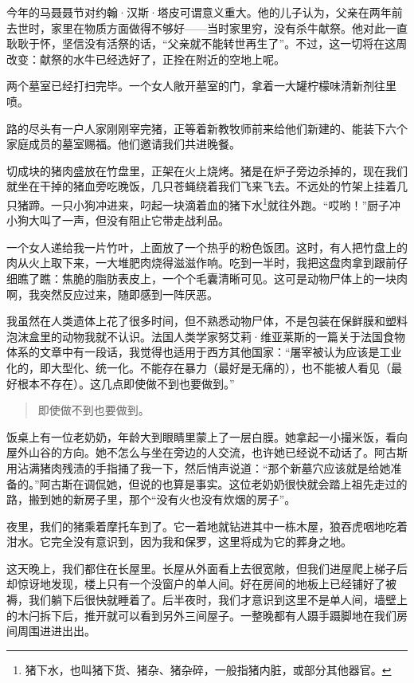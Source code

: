 \documentclass[12pt,oneside]{book}
\begin{document}
\begin{bookref}[frametitle={\cite{好好告别：世界葬礼观察手记}}]
今年的马聂聂节对约翰·汉斯·塔皮可谓意义重大。他的儿子认为，父亲在两年前去世时，家里在物质方面做得不够好——当时家里穷，没有杀牛献祭。他对此一直耿耿于怀，坚信没有活祭的话，“父亲就不能转世再生了”。不过，这一切将在这周改变：献祭的水牛已经选好了，正拴在附近的空地上呢。

两个墓室已经打扫完毕。一个女人敞开墓室的门，拿着一大罐柠檬味清新剂往里喷。

路的尽头有一户人家刚刚宰完猪，正等着新教牧师前来给他们新建的、能装下六个家庭成员的墓室赐福。他们邀请我们共进晚餐。

切成块的猪肉盛放在竹盘里，正架在火上烧烤。猪是在炉子旁边杀掉的，现在我们就坐在干掉的猪血旁吃晚饭，几只苍蝇绕着我们飞来飞去。不远处的竹架上挂着几只猪蹄。一只小狗冲进来，叼起一块滴着血的猪下水\footnote{猪下水，也叫猪下货、猪杂、猪杂碎，一般指猪内脏，或部分其他器官。}就往外跑。“哎哟！”厨子冲小狗大叫了一声，但没有阻止它带走战利品。

一个女人递给我一片竹叶，上面放了一个热乎的粉色饭团。这时，有人把竹盘上的肉从火上取下来，一大堆肥肉烧得滋滋作响。吃到一半时，我把这盘肉拿到跟前仔细瞧了瞧：焦脆的脂肪表皮上，一个个毛囊清晰可见。这可是动物尸体上的一块肉啊，我突然反应过来，随即感到一阵厌恶。

我虽然在人类遗体上花了很多时间，但不熟悉动物尸体，不是包装在保鲜膜和塑料泡沫盒里的动物我就不认识。法国人类学家努艾莉·维亚莱斯的一篇关于法国食物体系的文章中有一段话，我觉得也适用于西方其他国家：“屠宰被认为应该是工业化的，即大型化、统一化。不能存在暴力（最好是无痛的），也不能被人看见（最好根本不存在）。这几点即使做不到也要做到。”

\begin{quote}
即使做不到也要做到。
\end{quote}

饭桌上有一位老奶奶，年龄大到眼睛里蒙上了一层白膜。她拿起一小撮米饭，看向屋外山谷的方向。她不怎么与坐在旁边的人交流，也许她已经说不动话了。阿古斯用沾满猪肉残渍的手指捅了我一下，然后悄声说道：“那个新墓穴应该就是给她准备的。”阿古斯在调侃她，但说的也算是事实。这位老奶奶很快就会踏上祖先走过的路，搬到她的新房子里，那个“没有火也没有炊烟的房子”。

夜里，我们的猪乘着摩托车到了。它一着地就钻进其中一栋木屋，狼吞虎咽地吃着泔水。它完全没有意识到，因为我和保罗，这里将成为它的葬身之地。

这天晚上，我们都住在长屋里。长屋从外面看上去很宽敞，但我们进屋爬上梯子后却惊讶地发现，楼上只有一个没窗户的单人间。好在房间的地板上已经铺好了被褥，我们躺下后很快就睡着了。后半夜时，我们才意识到这里不是单人间，墙壁上的木闩拆下后，推开就可以看到另外三间屋子。一整晚都有人蹑手蹑脚地在我们房间周围进进出出。


\end{bookref}
\end{document}
